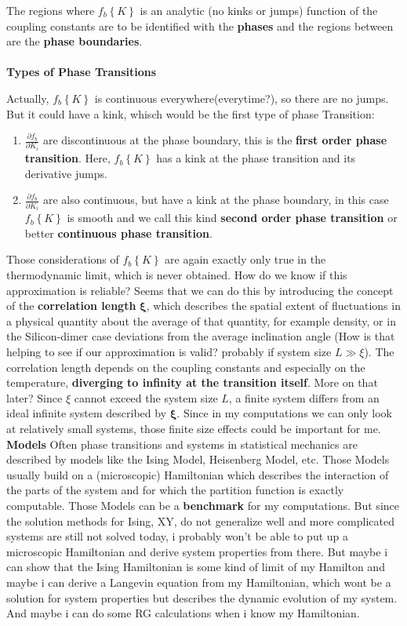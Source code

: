 	The regions where $f_b\left\lbrace K \right\rbrace$ is an analytic (no kinks or jumps) function of the coupling constants are to be identified with the \textbf{phases} and the regions between are the \textbf{phase boundaries}.
	\\
	\\
	\textbf{Types of Phase Transitions}
	
	Actually, $f_b\left\lbrace K \right\rbrace$ is continuous everywhere(everytime?), so there are no jumps. But it could have a kink, whisch would be the first type of phase Transition:
	\begin{enumerate}
		\item $\frac{\partial f_b}{\partial K_i}$ are discontinuous at the phase boundary, this is the \textbf{first order phase transition}. Here, $f_b\left\lbrace K \right\rbrace$ has a kink at the phase transition and its derivative jumps.
		\item $\frac{\partial f_b}{\partial K_i}$ are also continuous, but have a kink at the phase boundary, in this case $f_b\left\lbrace K \right\rbrace$ is smooth and we call this kind \textbf{second order phase transition} or better \textbf{continuous phase transition}.
	\end{enumerate}
	Those considerations of $f_b\left\lbrace K \right\rbrace$ are again exactly only true in the thermodynamic limit, which is never obtained. How do we know if this approximation is reliable? Seems that we can do this by introducing the concept of the \textbf{correlation length} $\boldsymbol{\xi}$, which describes the spatial extent of fluctuations in a physical quantity about the average of that quantity, for example density, or in the Silicon-dimer case deviations from the average inclination angle (How is that helping to see if our approximation is valid? probably if system size $ L \gg \xi$). The correlation length depends on the coupling constants and especially on the temperature, \textbf{diverging to infinity at the transition itself}. More on that later? Since $\xi$ cannot exceed the system size $L$, a finite system differs from an ideal infinite system described by $\boldsymbol{\xi}$. Since in my computations we can only look at relatively small systems, those finite size effects could be important for me.
	\newline
	\newline
	\textbf{Models}
	Often phase transitions and systems in statistical mechanics are described by models like the Ising Model, Heisenberg Model, etc. Those Models usually build on a (microscopic) Hamiltonian which describes the interaction of the parts of the system and for which the partition function is exactly computable. Those Models can be a \textbf{benchmark} for my computations. But since the solution methods for Ising, XY, do not generalize well and more complicated systems are still not solved today, i probably won't be able to put up a microscopic Hamiltonian and derive system properties from there. But maybe i can show that the Ising Hamiltonian is some kind of limit of my Hamilton and maybe i can derive a Langevin equation from my Hamiltonian, which wont be a solution for system properties but describes the dynamic evolution of my system. And maybe i can do some RG calculations when i know my Hamiltonian.
